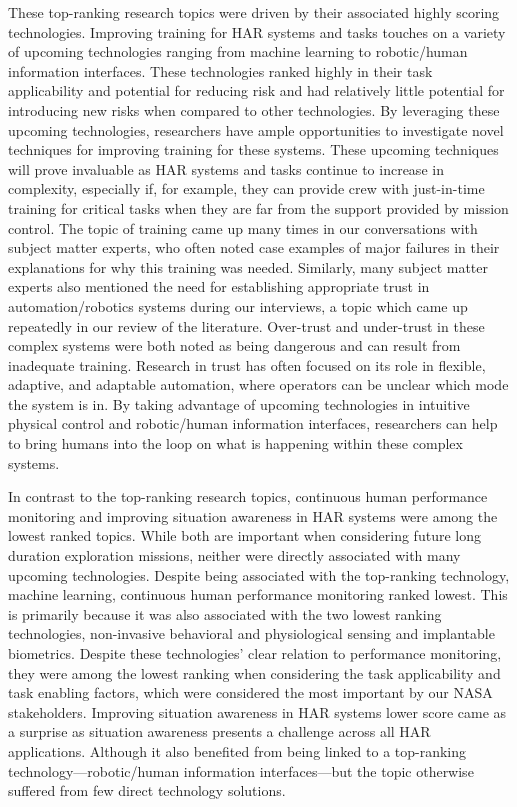 These top-ranking research topics were driven by their associated highly scoring technologies.
Improving training for HAR systems and tasks touches on a variety of upcoming technologies ranging from machine learning to robotic/human information interfaces.
These technologies ranked highly in their task applicability and potential for reducing risk and had relatively little potential for introducing new risks when compared to other technologies.
By leveraging these upcoming technologies, researchers have ample opportunities to investigate novel techniques for improving training for these systems.
These upcoming techniques will prove invaluable as HAR systems and tasks continue to increase in complexity, especially if, for example, they can provide crew with just-in-time training for critical tasks when they are far from the support provided by mission control.
The topic of training came up many times in our conversations with subject matter experts, who often noted case examples of major failures in their explanations for why this training was needed.
Similarly, many subject matter experts also mentioned the need for establishing appropriate trust in automation/robotics systems during our interviews, a topic which came up repeatedly in our review of the literature.
Over-trust and under-trust in these complex systems were both noted as being dangerous and can result from inadequate training.
Research in trust has often focused on its role in flexible, adaptive, and adaptable automation, where operators can be unclear which mode the system is in.
By taking advantage of upcoming technologies in intuitive physical control and robotic/human information interfaces, researchers can help to bring humans into the loop on what is happening within these complex systems.

In contrast to the top-ranking research topics, continuous human performance monitoring and improving situation awareness in HAR systems were among the lowest ranked topics.
While both are important when considering future long duration exploration missions, neither were directly associated with many upcoming technologies.
Despite being associated with the top-ranking technology, machine learning, continuous human performance monitoring ranked lowest.
This is primarily because it was also associated with the two lowest ranking technologies, non-invasive behavioral and physiological sensing and implantable biometrics.
Despite these technologies' clear relation to performance monitoring, they were among the lowest ranking when considering the task applicability and task enabling factors, which were considered the most important by our NASA stakeholders.
Improving situation awareness in HAR systems lower score came as a surprise as situation awareness presents a challenge across all HAR applications.
Although it also benefited from being linked to a top-ranking technology—robotic/human information interfaces—but the topic otherwise suffered from few direct technology solutions.

